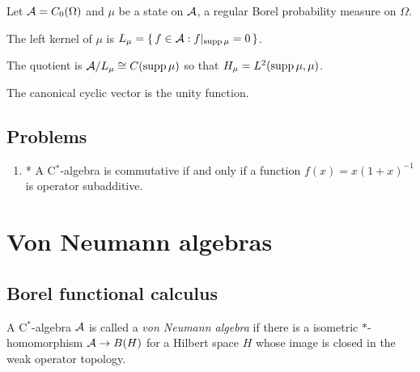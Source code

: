 \documentclass{../../large}
\begin{document}
\begin{prb}
Let $\mathcal{A}=C_0(\Omega)$ and $\mu$ be a state on $\mathcal{A}$, a regular Borel probability measure on $\Omega$.
\begin{parts}
\item The left kernel of $\mu$ is $L_\mu=\{\,f\in\mathcal{A}:f|_{\operatorname{supp}\mu}=0\,\}$.
\item The quotient is $\mathcal{A}/L_\mu\cong C(\operatorname{supp}\mu)$ so that $H_\mu=L^2(\operatorname{supp}\mu,\mu)$.
\item The canonical cyclic vector is the unity function.
\end{parts}
\end{prb}

\begin{prb}[Representations of $K(H)$]
\end{prb}


\begin{prb}
\end{prb}


\begin{prb}
\end{prb}

\begin{prb}
\end{prb}


\section*{Problems}
\begin{enumerate}
\item* A C$^*$-algebra is commutative if and only if a function $f(x)=x(1+x)^{-1}$ is operator subadditive.
\end{enumerate}


\chapter{Von Neumann algebras}

\section{Borel functional calculus}

\begin{prb}
A C$^*$-algebra $\mathcal{A}$ is called a \emph{von Neumann algebra} if there is a isometric $*$-homomorphism $\mathcal{A}\to B(H)$ for a Hilbert space $H$ whose image is closed in the weak operator topology.
\end{prb}
\end{document}
